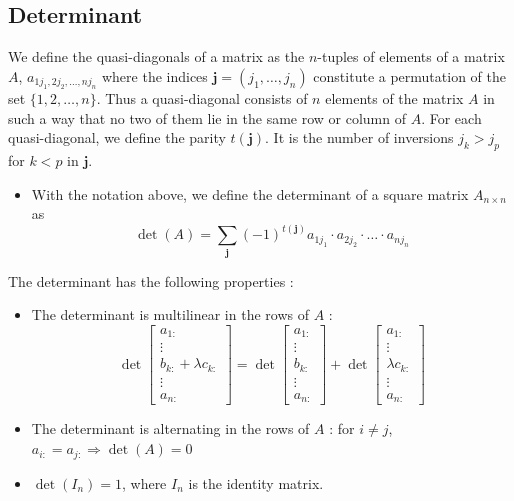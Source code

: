 \documentclass[12pt, openany]{report}
\theoremstyle{definition}
\begin{document}
\subsection{Determinant}
We define the quasi-diagonals of a matrix as the \(n\)-tuples of elements of a matrix \(A\), \(a_{1j_1,2j_2,\dots,nj_n}\) where the indices \(\textbf{j} = (j_1,\dots,j_n)\) constitute a permutation of the set \(\{1,2,\dots,n\}\). Thus a quasi-diagonal consists of \(n\) elements of the matrix \(A\) in such a way that no two of them lie in the same row or column of \(A\). For each quasi-diagonal, we define the parity \(t(\textbf{j})\). It is the number of inversions \(j_k>j_p\) for \(k<p\) in \(\textbf{j}\).
\begin{itemize}
    \item With the notation above, we define the determinant of a square matrix \(A_{n\times n}\) as \[\det (A) = \sum_\textbf{j} (-1)^{t(\textbf{j})} a_{1j_1}\cdot a_{2j_2}\cdot \dots \cdot a_{nj_n}\]
\end{itemize}
The determinant has the following properties :
\begin{itemize}
    \item The determinant is multilinear in the rows of \(A\) : \[\det \begin{bmatrix}
        a_{1:}\\ \vdots \\ b_{k:} +\lambda c_{k:} \\ \vdots \\ a_{n:}
    \end{bmatrix} = \det \begin{bmatrix}
        a_{1:}\\ \vdots \\ b_{k:} \\ \vdots \\ a_{n:}
    \end{bmatrix} + \det \begin{bmatrix}
        a_{1:}\\ \vdots \\ \lambda c_{k:} \\ \vdots \\ a_{n:}
    \end{bmatrix}\]
    \item The determinant is alternating in the rows of \(A\) : for \(i\neq j\), \(a_{i:}=a_{j:} \Longrightarrow \det(A) = 0\)
    \item \(\det(I_n) = 1\), where \(I_n\) is the identity matrix.
\end{itemize}
\end{document}
